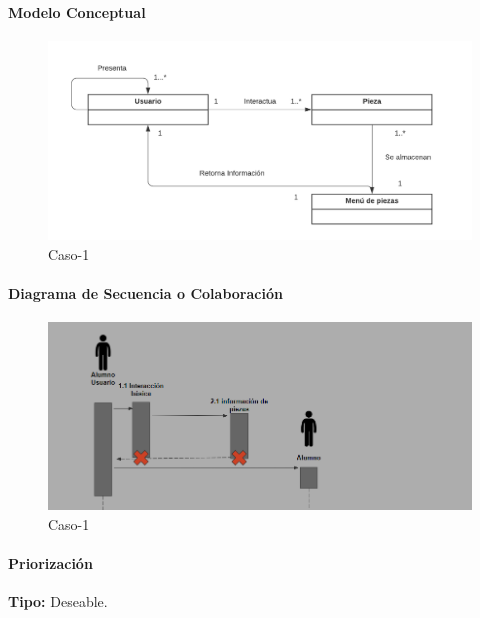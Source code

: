 \paragraph{Modelo Conceptual}

\begin{figure}[H]
\centerline{\includegraphics[width=15cm]{imgs/ModeloConceptualCaso_4_3.png}}
\caption{Caso-1}
\label{fig}
\end{figure}


\paragraph{Diagrama de Secuencia o Colaboración}

\begin{figure}[H]
\centerline{\includegraphics[width=15cm]{imgs/CasoUso_4_2.PNG}}
\caption{Caso-1}
\label{fig}
\end{figure}

\paragraph{Priorización}
{\textbf {Tipo:}}
Deseable.